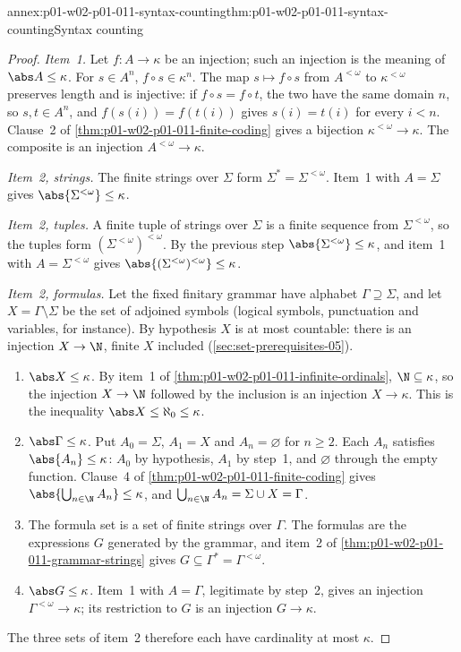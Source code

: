 \begin{annexitem}{annex:p01-w02-p01-011-syntax-counting}{thm:p01-w02-p01-011-syntax-counting}{Syntax counting}
\begin{proof}
\emph{Item~1.} Let \(f:A\to\kappa\) be an injection; such an injection is the
meaning of \(\abs A\leq\kappa\). For \(s\in A^n\), \(f\circ s\in\kappa^n\). The
map \(s\mapsto f\circ s\) from \(A^{<\omega}\) to \(\kappa^{<\omega}\)
preserves length and is injective: if \(f\circ s=f\circ t\), the two have
the same domain \(n\), so \(s,t\in A^n\), and \(f(s(i))=f(t(i))\) gives
\(s(i)=t(i)\) for every \(i<n\). Clause~2 of
\cref{thm:p01-w02-p01-011-finite-coding} gives a bijection
\(\kappa^{<\omega}\to\kappa\). The composite is an injection
\(A^{<\omega}\to\kappa\).

\emph{Item~2, strings.} The finite strings over \(\Sigma\) form
\(\Sigma^*=\Sigma^{<\omega}\). Item~1 with \(A=\Sigma\) gives
\(\abs{\Sigma^{<\omega}}\leq\kappa\).

\emph{Item~2, tuples.} A finite tuple of strings over \(\Sigma\) is a finite
sequence from \(\Sigma^{<\omega}\), so the tuples form
\((\Sigma^{<\omega})^{<\omega}\). By the previous step
\(\abs{\Sigma^{<\omega}}\leq\kappa\), and item~1 with
\(A=\Sigma^{<\omega}\) gives \(\abs{(\Sigma^{<\omega})^{<\omega}}\leq\kappa\).

\emph{Item~2, formulas.} Let the fixed finitary grammar have alphabet
\(\Gamma\supseteq\Sigma\), and let \(X=\Gamma\setminus\Sigma\) be the set of
adjoined symbols (logical symbols, punctuation and variables, for
instance). By hypothesis \(X\) is at most countable: there is an injection
\(X\to\N\), finite \(X\) included (\cref{sec:set-prerequisites-05}).
\begin{enumerate}
  \item \(\abs X\leq\kappa\). By item~1 of
        \cref{thm:p01-w02-p01-011-infinite-ordinals},
        \(\N\subseteq\kappa\), so the injection \(X\to\N\) followed by the
        inclusion is an injection \(X\to\kappa\). This is the inequality
        \(\abs X\leq\aleph_0\leq\kappa\).
  \item \(\abs\Gamma\leq\kappa\). Put \(A_0=\Sigma\), \(A_1=X\) and
        \(A_n=\varnothing\) for \(n\geq2\). Each \(A_n\) satisfies
        \(\abs{A_n}\leq\kappa\): \(A_0\) by hypothesis, \(A_1\) by step~1,
        and \(\varnothing\) through the empty function. Clause~4 of
        \cref{thm:p01-w02-p01-011-finite-coding} gives
        \(\abs{\bigcup_{n\in\N}A_n}\leq\kappa\), and
        \(\bigcup_{n\in\N}A_n=\Sigma\cup X=\Gamma\).
  \item The formula set is a set of finite strings over \(\Gamma\). The
        formulas are the expressions \(G\) generated by the grammar, and
        item~2 of \cref{thm:p01-w02-p01-011-grammar-strings} gives
        \(G\subseteq\Gamma^*=\Gamma^{<\omega}\).
  \item \(\abs G\leq\kappa\). Item~1 with \(A=\Gamma\), legitimate by
        step~2, gives an injection \(\Gamma^{<\omega}\to\kappa\); its
        restriction to \(G\) is an injection \(G\to\kappa\).
\end{enumerate}
The three sets of item~2 therefore each have cardinality at most
\(\kappa\).
\end{proof}
\end{annexitem}
